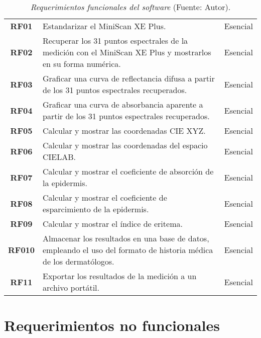 	\begin{table}[h]
		\small
		\caption[Requerimientos funcionales del software]{\textit{Requerimientos funcionales del software} (Fuente: Autor).}
		\centering
		\setlength{\extrarowheight}{\altocelda}
		\begin{tabulary}{\anchotabla}{|c|J|c|}
			\hline
			 &  & \\ \hline
			
			\textbf{RF01} & Estandarizar el MiniScan XE Plus. & Esencial\\ \hline
			
			\textbf{RF02} & Recuperar los 31 puntos espectrales de la medici\'{o}n con el MiniScan XE Plus y mostrarlos en su forma num\'{e}rica. & Esencial\\ \hline

			\textbf{RF03} & Graficar una curva de reflectancia difusa a partir de los 31 puntos espectrales recuperados. & Esencial\\ \hline
			\textbf{RF04} & Graficar una curva de absorbancia aparente a partir de los 31 puntos espectrales recuperados. & Esencial\\ \hline
			\textbf{RF05} & Calcular y mostrar las coordenadas CIE XYZ. & Esencial\\ \hline
			\textbf{RF06} & Calcular y mostrar las coordenadas del espacio CIELAB. & Esencial\\ \hline
			\textbf{RF07} & Calcular y mostrar el coeficiente de absorci\'{o}n de la epidermis. & Esencial\\ \hline
			\textbf{RF08} & Calcular y mostrar el coeficiente de esparcimiento de la epidermis. & Esencial\\ \hline
			\textbf{RF09} & Calcular y mostrar el \'{i}ndice de eritema. & Esencial\\ \hline
			\textbf{RF010} & Almacenar los resultados en una base de datos, empleando el uso del formato de historia m\'{e}dica de los dermat\'{o}logos. & Esencial\\ \hline
			\textbf{RF11} & Exportar los resultados de la medici\'{o}n a un archivo port\'{a}til. & Esencial\\ \hline
		\end{tabulary}
	\end{table}
	
\section{Requerimientos no funcionales}
	
